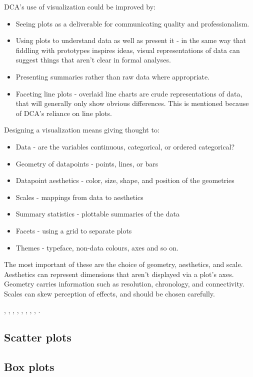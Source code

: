 \documentclass[11pt,a4paper,article]{memoir} %
\begin{document}
DCA's use of visualization could be improved by:
\begin{itemize}
\item Seeing plots as a deliverable for communicating quality and professionalism.
\item Using plots to understand data as well as present it - in the same way that fiddling with prototypes inspires ideas, visual representations of data can suggest things that aren't clear in formal analyses.
\item Presenting summaries rather than raw data where appropriate.
\item Faceting line plots - overlaid line charts are crude representations of data, that will generally only show obvious differences. This is mentioned because of DCA's reliance on line plots.
\end{itemize}
Designing a visualization means giving thought to:
\begin{itemize}
\item Data - are the variables continuous, categorical, or ordered categorical?
\item Geometry of datapoints - points, lines, or bars
\item Datapoint aesthetics - color, size, shape, and position of the geometries
\item Scales - mappings from data to aesthetics
\item Summary statistics - plottable summaries of the data
\item Facets - using a grid to separate plots
\item Themes - typeface, non-data colours, axes and so on.
\end{itemize}
The most important of these are the choice of geometry, aesthetics, and scale. Aesthetics can represent dimensions that aren't displayed via a plot's axes. Geometry carries information such as resolution, chronology,  and connectivity. Scales can skew perception of effects, and should be chosen carefully.

\cite{hastie2013elements}, \cite{gelman2013bayesian}, \cite{faraway2004linear}, \cite{blitzstein2014linear}, \cite{jaynes2003probability}, \cite{wickham2009ggplot2}, \cite{montgomery2000design}, \cite{kruschke2015doing}, \cite{iso2014statistical}.


\subsection{Scatter plots}
\subsection{Box plots}
\end{document}
